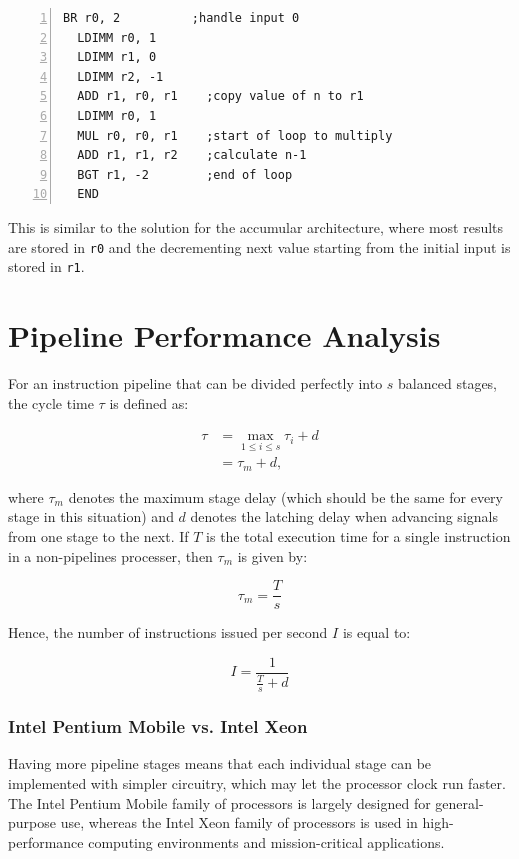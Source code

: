 \documentclass[a4paper, 12pt, oneside]{book}
\begin{document}
\begin{Verbatim}[numbers=left,xleftmargin=5mm]
  BR r0, 2          ;handle input 0
  LDIMM r0, 1
  LDIMM r1, 0
  LDIMM r2, -1
  ADD r1, r0, r1    ;copy value of n to r1
  LDIMM r0, 1
  MUL r0, r0, r1    ;start of loop to multiply
  ADD r1, r1, r2    ;calculate n-1
  BGT r1, -2        ;end of loop
  END
\end{Verbatim}

This is similar to the solution for the accumular architecture, where most results are stored in \texttt{r0} and the decrementing next value starting from the initial input is stored in \texttt{r1}.

\section{Pipeline Performance Analysis}
For an instruction pipeline that can be divided perfectly into $s$ balanced stages, the cycle time $\tau$ is defined as:

\begin{align*}
  \tau & = \max_{1\le i\le s}\tau_i + d \\
       & = \tau_m + d,\
\end{align*}

where $\tau_m$ denotes the maximum stage delay (which should be the same for every stage in this situation) and $d$ denotes the latching delay when advancing signals from one stage to the next. If $T$ is the total execution time for a single instruction in a non-pipelines processer, then $\tau_m$ is given by:

\[\tau_m = \frac{T}{s}\]

Hence, the number of instructions issued per second $I$ is equal to:

\[I = \frac{1}{\frac{T}{s} + d}\]

\subsubsection{Intel Pentium Mobile vs. Intel Xeon}
Having more pipeline stages means that each individual stage can be implemented with simpler circuitry, which may let the processor clock run faster.\\

The Intel Pentium Mobile family of processors is largely designed for general-purpose use, whereas the Intel Xeon family of processors is used in high-performance computing environments and mission-critical applications.\\
\end{document}
